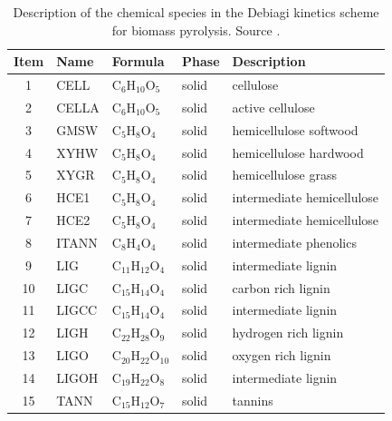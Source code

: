 \begin{center}
\footnotesize
\begin{longtable}{cllll}
    \caption{Description of the chemical species in the Debiagi kinetics scheme for biomass pyrolysis. Source \cite{Debiagi-2018}.}
    \label{tab:chem-species} \\
    \toprule
    Item & Name & Formula & Phase & Description \\
    \midrule
    1  & CELL           & C$_6$H$_{10}$O$_5$      & \cellcolor{green!25}solid        & cellulose \\
    2  & CELLA          & C$_6$H$_{10}$O$_5$      & \cellcolor{green!25}solid        & active cellulose \\
    3  & GMSW           & C$_5$H$_{8}$O$_4$       & \cellcolor{green!25}solid        & hemicellulose softwood \\
    4  & XYHW           & C$_5$H$_{8}$O$_4$       & \cellcolor{green!25}solid        & hemicellulose hardwood \\
    5  & XYGR           & C$_5$H$_{8}$O$_4$       & \cellcolor{green!25}solid        & hemicellulose grass \\
    6  & HCE1           & C$_5$H$_{8}$O$_4$       & \cellcolor{green!25}solid        & intermediate hemicellulose \\
    7  & HCE2           & C$_5$H$_{8}$O$_4$       & \cellcolor{green!25}solid        & intermediate hemicellulose \\
    8  & ITANN          & C$_8$H$_{4}$O$_4$       & \cellcolor{green!25}solid        & intermediate phenolics \\
    9  & LIG            & C$_{11}$H$_{12}$O$_4$   & \cellcolor{green!25}solid        & intermediate lignin \\
    10 & LIGC           & C$_{15}$H$_{14}$O$_4$   & \cellcolor{green!25}solid        & carbon rich lignin \\
    11 & LIGCC          & C$_{15}$H$_{14}$O$_4$   & \cellcolor{green!25}solid        & intermediate lignin \\
    12 & LIGH           & C$_{22}$H$_{28}$O$_9$   & \cellcolor{green!25}solid        & hydrogen rich lignin \\
    13 & LIGO           & C$_{20}$H$_{22}$O$_{10}$& \cellcolor{green!25}solid        & oxygen rich lignin \\
    14 & LIGOH          & C$_{19}$H$_{22}$O$_8$   & \cellcolor{green!25}solid        & intermediate lignin \\
    15 & TANN           & C$_{15}$H$_{12}$O$_7$   & \cellcolor{green!25}solid        & tannins \\

\end{longtable}
\end{center}
